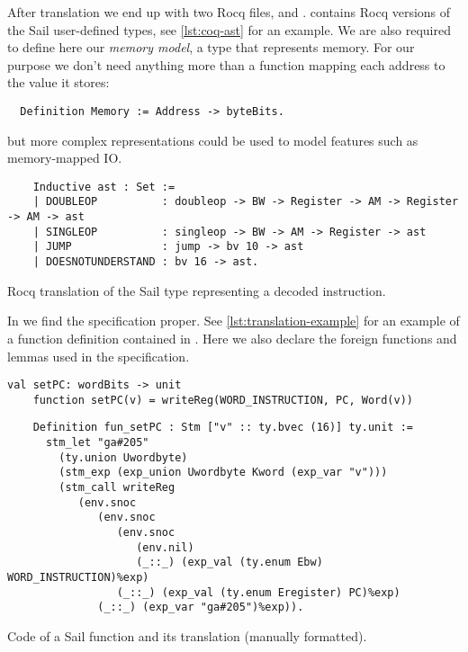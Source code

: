 After translation we end up with two Rocq files,  and .  contains Rocq versions of the Sail user-defined types, see \cref{lst:coq-ast} for an example. We are also required to define here our \emph{memory model}, \ie a type that represents memory. For our purpose we don't need anything more than a function mapping each address to the value it stores:
\begin{verbatim}
  Definition Memory := Address -> byteBits.
\end{verbatim}
but more complex representations could be used to model features such as memory-mapped IO.

\begin{listing}
  \begin{verbatim}
    Inductive ast : Set :=
    | DOUBLEOP          : doubleop -> BW -> Register -> AM -> Register -> AM -> ast
    | SINGLEOP          : singleop -> BW -> AM -> Register -> ast
    | JUMP              : jump -> bv 10 -> ast
    | DOESNOTUNDERSTAND : bv 16 -> ast.
  \end{verbatim}
  \caption{Rocq translation of the Sail type representing a decoded instruction.}
  \label{lst:coq-ast}
\end{listing}

In  we find the \usail specification proper. See \cref{lst:translation-example} for an example of a \usail function definition contained in . Here we also declare the foreign functions and lemmas used in the specification.

\begin{listing}
  \begin{lstlisting}[language=sail]
    val setPC: wordBits -> unit
    function setPC(v) = writeReg(WORD_INSTRUCTION, PC, Word(v))
  \end{lstlisting}
  \begin{verbatim}
    Definition fun_setPC : Stm ["v" :: ty.bvec (16)] ty.unit :=
      stm_let "ga#205"
        (ty.union Uwordbyte)
        (stm_exp (exp_union Uwordbyte Kword (exp_var "v")))
        (stm_call writeReg
           (env.snoc
              (env.snoc
                 (env.snoc
                    (env.nil)
                    (_::_) (exp_val (ty.enum Ebw) WORD_INSTRUCTION)%exp)
                 (_::_) (exp_val (ty.enum Eregister) PC)%exp)
              (_::_) (exp_var "ga#205")%exp)).
  \end{verbatim}
  \caption{Code of a Sail function and its \usail translation (manually formatted).}
  \label{lst:translation-example}
\end{listing}

